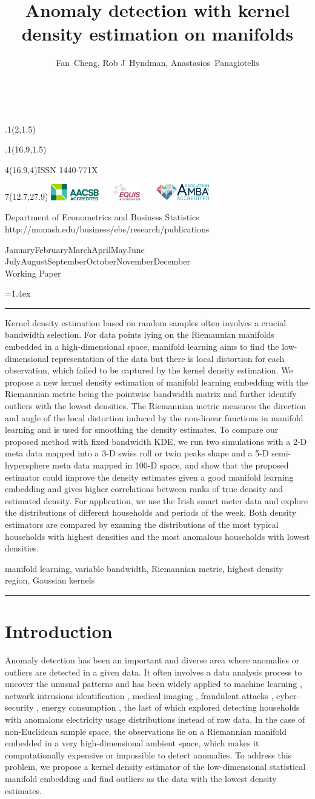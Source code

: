 \documentclass[11pt,a4paper,]{article}
\title{Anomaly detection with kernel density estimation on manifolds}
\author{Fan~Cheng, Rob J~Hyndman, Anastasios~Panagiotelis}
\date{\sf\Date~\Month~\Year}
\makeatletter
\def\Date{\number\day}
\def\Month{\ifcase\month\or
 January\or February\or March\or April\or May\or June\or
 July\or August\or September\or October\or November\or December\fi}
\def\Year{\number\year}
\def\showjel{{\large\textsf{\textbf{JEL classification:}}~\@jel}}
\def\cover{{\sffamily\setcounter{page}{0}
        \thispagestyle{empty}
        \placefig{2}{1.5}{width=5cm}{monash2}
        \placefig{16.9}{1.5}{width=2.1cm}{MBusSchool}
        \begin{textblock}{4}(16.9,4)ISSN 1440-771X\end{textblock}
        \begin{textblock}{7}(12.7,27.9)\hfill
        \includegraphics[height=0.7cm]{AACSB}~~~
        \includegraphics[height=0.7cm]{EQUIS}~~~
        \includegraphics[height=0.7cm]{AMBA}
        \end{textblock}
        \vspace*{2cm}
        \begin{center}\Large
        Department of Econometrics and Business Statistics\\[.5cm]
        \footnotesize http://monash.edu/business/ebs/research/publications
        \end{center}\vspace{2cm}
        \begin{center}
        \fbox{\parbox{14cm}{\begin{onehalfspace}\centering\Huge\vspace*{0.3cm}
                \textsf{\textbf{\expandafter{\@title}}}\vspace{1cm}\par
                \LARGE\@author\end{onehalfspace}
        }}
        \end{center}
        \vfill
                \begin{center}\Large
                \Month~\Year\\[1cm]
                Working Paper \@wp
        \end{center}\vspace*{2cm}}}
\def\pageone{{\sffamily\setstretch{1}%
        \thispagestyle{empty}%
        \vbox to \textheight{%
        \raggedright\baselineskip=1.2cm
     {\fontsize{24.88}{30}\sffamily\textbf{\expandafter{\@title}}}
        \vspace{2cm}\par
        \hspace{1cm}\parbox{14cm}{\sffamily\large\@addresses}\vspace{1cm}\vfill
        \hspace{1cm}{\large\Date~\Month~\Year}\\[1cm]
        \hspace{1cm}\showjel\vss}}}
\def\blindtitle{{\sffamily
     \thispagestyle{plain}\raggedright\baselineskip=1.2cm
     {\fontsize{24.88}{30}\sffamily\textbf{\expandafter{\@title}}}\vspace{1cm}\par
        }}
\def\titlepage{{\cover\newpage\pageone\newpage\blindtitle}}
\let\maketitle\titlepage
\newenvironment{keywords}{\par\vspace{0.5cm}\noindent{\sffamily\textbf{Keywords:}}}{\vspace{0.25cm}\par\hrule\vspace{0.5cm}\par}
\renewenvironment{abstract}{\begin{minipage}{\textwidth}\parskip=1.4ex\noindent
\hrule\vspace{0.1cm}\par{\sffamily\textbf{\abstractname}}\newline}
  {\end{minipage}}
\def\placefig#1#2#3#4{\begin{textblock}{.1}(#1,#2)\rlap{\texttt{[image: \#4]}}\end{textblock}}
\makeatother
\begin{document}
\maketitle
\begin{abstract}
Kernel density estimation based on random samples often involves a crucial bandwidth selection. For data points lying on the Riemannian manifolds embedded in a high-dimensional space, manifold learning aims to find the low-dimensional representation of the data but there is local distortion for each observation, which failed to be captured by the kernel density estimation. We propose a new kernel density estimation of manifold learning embedding with the Riemannian metric being the pointwise bandwidth matrix and further identify outliers with the lowest densities. The Riemannian metric measures the direction and angle of the local distortion induced by the non-linear functions in manifold learning and is used for smoothing the density estimates. To compare our proposed method with fixed bandwidth KDE, we run two simulations with a 2-D meta data mapped into a 3-D swiss roll or twin peaks shape and a 5-D semi-hypersphere meta data mapped in 100-D space, and show that the proposed estimator could improve the density estimates given a good manifold learning embedding and gives higher correlations between ranks of true density and estimated density. For application, we use the Irish smart meter data and explore the distributions of different households and periods of the week. Both density estimators are compared by examing the distributions of the most typical households with highest densities and the most anomalous households with lowest densities.
\end{abstract}
\begin{keywords}
manifold learning, variable bandwidth, Riemannian metric, highest density region, Gaussian kernels
\end{keywords}

\newpage

\hypertarget{introduction}{%
\section{Introduction}\label{introduction}}

Anomaly detection has been an important and diverse area where anomalies
or outliers are detected in a given data. It often involves a data
analysis process to uncover the unusual patterns and has been widely
applied to machine learning \autocite{Omar2013-lz}, network intrusions
identification \autocite{Ahmed2016-co,Bhuyan2013-ra}, medical imaging
\autocite{Fernando2022-ef}, fraudulent attacks \autocite{Ahmed2016-dz}, cyber-security
\autocite{Ten2011-co}, energy consumption \autocite{Cheng2021-ex}, the last of which
explored detecting households with anomalous electricity usage
distributions instead of raw data. In the case of non-Euclidean sample
space, the observations lie on a Riemannian manifold embedded in a very
high-dimensional ambient space, which makes it computationally expensive
or impossible to detect anomalies. To address this problem, we propose a
kernel density estimator of the low-dimensional statistical manifold
embedding and find outliers as the data with the lowest density
estimates.
\end{document}
